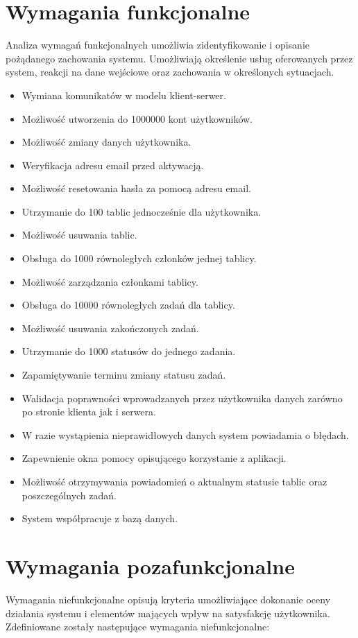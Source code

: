 \documentclass[12pt]{report}
\begin{document}
\section{Wymagania funkcjonalne}
Analiza wymagań funkcjonalnych umożliwia zidentyfikowanie i opisanie pożądanego zachowania systemu. 
Umożliwiają określenie usług oferowanych przez system, reakcji na dane wejściowe oraz zachowania w określonych sytuacjach.
\begin{itemize}
\item Wymiana komunikatów w modelu klient-serwer.
\item Możliwość utworzenia do 1000000 kont użytkowników.
\item Możliwość zmiany danych użytkownika.
\item Weryfikacja adresu email przed aktywacją.
\item Możliwość resetowania hasła za pomocą adresu email.
\item Utrzymanie do 100 tablic jednocześnie dla użytkownika.
\item Możliwość usuwania tablic.
\item Obsługa do 1000 równoległych członków jednej tablicy.
\item Możliwość zarządzania członkami tablicy.
\item Obsługa do 10000 równoległych zadań dla tablicy.
\item Możliwość usuwania zakończonych zadań.
\item Utrzymanie do 1000 statusów do jednego zadania.
\item Zapamiętywanie terminu zmiany statusu zadań.
\item Walidacja poprawności wprowadzanych przez użytkownika danych zarówno po stronie klienta jak i serwera.
\item W razie wystąpienia nieprawidłowych danych system powiadamia o błędach.
\item Zapewnienie okna pomocy opisującego korzystanie z aplikacji.
\item Możliwość otrzymywania powiadomień o aktualnym statusie tablic oraz poszczególnych zadań.
\item System współpracuje z bazą danych.
\end{itemize}

\section{Wymagania pozafunkcjonalne}
Wymagania niefunkcjonalne opisują kryteria umożliwiające dokonanie oceny działania systemu i elementów mających wpływ na satysfakcję użytkownika.
Zdefiniowane zostały następujące wymagania niefunkcjonalne:
\end{document}
